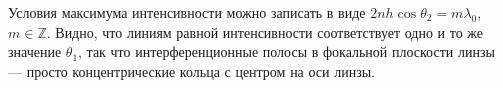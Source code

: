 \documentclass[11pt,a4paper]{article}
\numberwithin{equation}{section}
\begin{document}
\begin{center}
\end{center}

Условия максимума интенсивности можно записать в виде $2nh \cos
\theta_2 = m \lambda_0$, $m \in \mathbb{Z}$. Видно, что линиям равной
интенсивности соответствует одно и то же значение $\theta_1$, так что
интерференционные полосы в фокальной плоскости линзы --- просто
концентрические кольца с центром на оси линзы.
\end{document}
